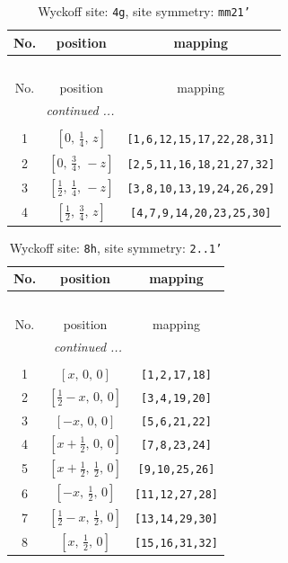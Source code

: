 \documentclass[fleqn,8pt]{jsarticle}
\begin{document}
\renewcommand{\arraystretch}{1.2}
\begin{longtable}{ccc}
\caption{Wyckoff site: {\tt 4g}, site symmetry: {\tt mm21'}}
 \\
 \hline \hline
No. & position & mapping \\ \hline \endfirsthead

\multicolumn{2}{l}{\tablename\ \thetable{}} \\
 \hline \hline
No. & position & mapping \\ \hline \endhead

 \hline \hline
\multicolumn{2}{r}{\footnotesize\it continued ...} \\ \endfoot

 \hline \hline
\multicolumn{2}{r}{} \\ \endlastfoot

1 & $\left[ 0,\, \frac{1}{4},\, z \right]$ & {\tt [1,6,12,15,17,22,28,31]} \\ \hline
2 & $\left[ 0,\, \frac{3}{4},\, - z \right]$ & {\tt [2,5,11,16,18,21,27,32]} \\ \hline
3 & $\left[ \frac{1}{2},\, \frac{1}{4},\, - z \right]$ & {\tt [3,8,10,13,19,24,26,29]} \\ \hline
4 & $\left[ \frac{1}{2},\, \frac{3}{4},\, z \right]$ & {\tt [4,7,9,14,20,23,25,30]} \\
\end{longtable}
\renewcommand{\arraystretch}{1.2}
\begin{longtable}{ccc}
\caption{Wyckoff site: {\tt 8h}, site symmetry: {\tt 2..1'}}
 \\
 \hline \hline
No. & position & mapping \\ \hline \endfirsthead

\multicolumn{2}{l}{\tablename\ \thetable{}} \\
 \hline \hline
No. & position & mapping \\ \hline \endhead

 \hline \hline
\multicolumn{2}{r}{\footnotesize\it continued ...} \\ \endfoot

 \hline \hline
\multicolumn{2}{r}{} \\ \endlastfoot

1 & $\left[ x,\, 0,\, 0 \right]$ & {\tt [1,2,17,18]} \\ \hline
2 & $\left[ \frac{1}{2} - x,\, 0,\, 0 \right]$ & {\tt [3,4,19,20]} \\ \hline
3 & $\left[ - x,\, 0,\, 0 \right]$ & {\tt [5,6,21,22]} \\ \hline
4 & $\left[ x + \frac{1}{2},\, 0,\, 0 \right]$ & {\tt [7,8,23,24]} \\ \hline
5 & $\left[ x + \frac{1}{2},\, \frac{1}{2},\, 0 \right]$ & {\tt [9,10,25,26]} \\ \hline
6 & $\left[ - x,\, \frac{1}{2},\, 0 \right]$ & {\tt [11,12,27,28]} \\ \hline
7 & $\left[ \frac{1}{2} - x,\, \frac{1}{2},\, 0 \right]$ & {\tt [13,14,29,30]} \\ \hline
8 & $\left[ x,\, \frac{1}{2},\, 0 \right]$ & {\tt [15,16,31,32]} \\
\end{longtable}
\end{document}
